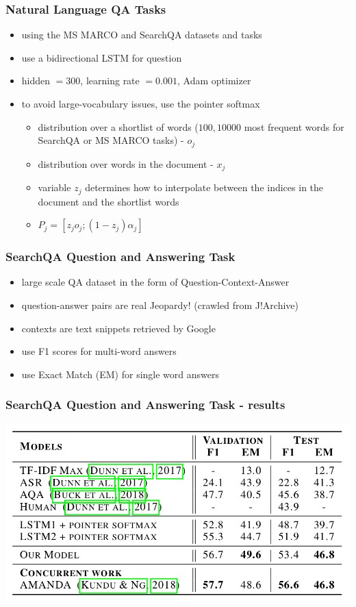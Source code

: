 \documentclass{beamer}
\begin{document}
\begin{frame}
    \frametitle{Natural Language QA Tasks}
    \begin{itemize}
        \item using the MS MARCO and SearchQA datasets and tasks
        \item use a bidirectional LSTM for question
        \item hidden $= 300$, learning rate $= 0.001$, Adam optimizer
        \item to avoid large-vocabulary issues, use the pointer softmax
        \begin{itemize}
            \item distribution over a shortlist of words ($100, 10000$ most frequent words for SearchQA or MS MARCO tasks) - $o_j$
            \item distribution over words in the document - $x_j$
            \item variable $z_j$ determines how to interpolate between the indices in the document and the shortlist words
            \item $P_j = [z_{j}o_{j};(1-z_j)\alpha_j]$
        \end{itemize}
    \end{itemize}
\end{frame}

\begin{frame}
    \frametitle{SearchQA Question and Answering Task}
    \begin{itemize}
        \item large scale QA dataset in the form of Question-Context-Answer
        \item question-answer pairs are real Jeopardy! (crawled from
J!Archive)
        \item contexts are text snippets retrieved by Google
        \item use F1 scores for multi-word answers
        \item use Exact Match (EM) for single word answers
    \end{itemize}
\end{frame}

\begin{frame}
    \frametitle{SearchQA Question and Answering Task - results}
    \begin{center}
        \includegraphics[scale=1.45]{img/searchqa-table.png}
    \end{center}
\end{frame}
\end{document}
